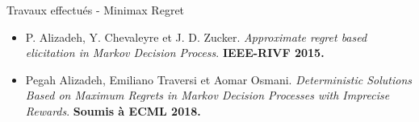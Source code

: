 \documentclass{beamer}
\begin{document}
{{\begin{frame}{Travaux effectués - Minimax Regret }
\begin{itemize}
\small
\item  P. Alizadeh, Y. Chevaleyre et J. D. Zucker. \textit{Approximate regret based elicitation in Markov Decision Process}. \textbf{IEEE-RIVF 2015.} 
\item Pegah Alizadeh, Emiliano Traversi et Aomar Osmani. \textit{Deterministic Solutions Based on Maximum Regrets in Markov Decision Processes with Imprecise Rewards}. \textbf{Soumis à ECML 2018.}
\end{itemize}

\end{frame}



%
%
%
%
%

}}
\end{document}
